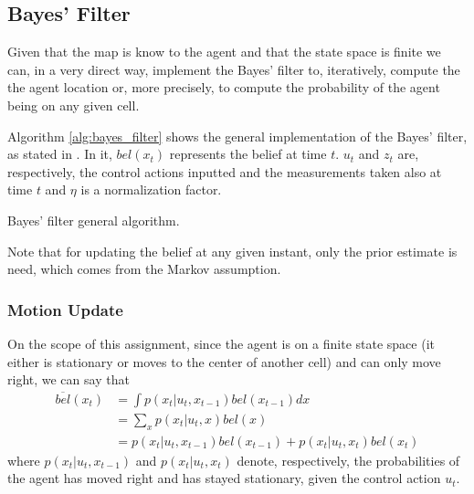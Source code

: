 \documentclass[runningheads]{llncs}
\begin{document}
\subsection{Bayes' Filter}
\label{subsec:bayes_filter}

Given that the map is know to the agent and that the state space is finite we can, in a very direct way, implement the Bayes' filter to, iteratively, compute the the agent location or, more precisely, to compute the probability of the agent being on any given cell.

Algorithm \ref{alg:bayes_filter} shows the general implementation of the Bayes' filter, as stated in \cite{thrun2005probabilistic}. In it, $bel(x_t)$ represents the belief at time $t$. $u_t$ and $z_t$ are, respectively, the control actions inputted and the measurements taken also at time $t$ and $\eta$ is a normalization factor.

\begin{algorithm}[!ht]
    \DontPrintSemicolon


\caption{Bayes' filter general algorithm.}
\label{alg:bayes_filter}
\end{algorithm}
\FloatBarrier

Note that for updating the belief at any given instant, only the prior estimate is need, which comes from the Markov assumption.

\subsubsection{Motion Update}

On the scope of this assignment, since the agent is on a finite state space (it either is stationary or moves to the center of another cell) and can only move right, we can say that
%
\begin{equation*} 
    \label{eq1}
    \begin{split}
        \overline{bel}(x_t) &= \int p(x_t \vert u_t, x_{t-1}) bel(x_{t-1}) dx \\
        & = \sum_{x} p(x_t \vert u_t, x) bel(x) \\
        & = p(x_t \vert u_t, x_{t-1}) bel(x_{t-1}) + p(x_t \vert u_t, x_t) bel(x_t)
    \end{split}
\end{equation*}
%
where $p(x_t \vert u_t, x_{t-1})$ and $p(x_t \vert u_t, x_t)$ denote, respectively, the probabilities of the agent has moved right and has stayed stationary, given the control action $u_t$.
\end{document}
